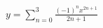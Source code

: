 \documentclass[preview]{standalone}
\begin{document}
\begin{align*}
y = \sum_{n=0}^{3} \frac{(-1)^n x^{2n+1}}{2n+1}
\end{align*}
\end{document}
